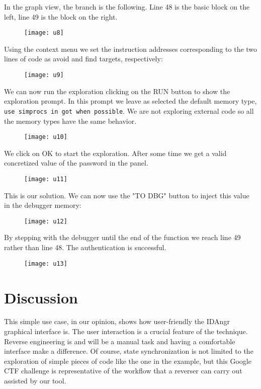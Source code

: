 In the graph view, the branch is the following. Line 48 is the basic block on the left, line 49 is the block on the right.

\begin{figure}[H]
  \centering
  \texttt{[image: u8]}
  \label{fig:u8}
\end{figure} 

Using the context menu we set the instruction addresses corresponding to the two lines of code as avoid and find targets, respectively:

\begin{figure}[H]
  \centering
  \texttt{[image: u9]}
  \label{fig:u9}
\end{figure} 

We can now run the exploration clicking on the RUN button to show the exploration prompt. In this prompt we leave as selected the default memory type, \verb|use simprocs in got when possible|. We are not exploring external code so all the memory types have the same behavior.

\begin{figure}[H]
  \centering
  \texttt{[image: u10]}
  \label{fig:u10}
\end{figure} 

We click on OK to start the exploration.
After some time we get a valid concretized value of the password in the panel. 

\begin{figure}[H]
  \centering
  \texttt{[image: u11]}
  \label{fig:u11}
\end{figure}

This is our solution. We can now use the "TO DBG" button to inject this value in the debugger memory:

\begin{figure}[H]
  \centering
  \texttt{[image: u12]}
  \label{fig:u12}
\end{figure}

By stepping with the debugger until the end of the function we reach line 49 rather than line 48. The authentication is successful.

\begin{figure}[H]
  \centering
  \texttt{[image: u13]}
  \label{fig:u13}
\end{figure}


\section{Discussion}

This simple use case, in our opinion, shows how user-friendly the IDAngr graphical interface is.
The user interaction is a crucial feature of the technique. Reverse engineering is and will be a manual task and having a comfortable interface make a difference.
Of course, state synchronization is not limited to the exploration of simple pieces of code like the one in the example, but this Google CTF challenge is representative of the workflow that a reverser can carry out assisted by our tool.


